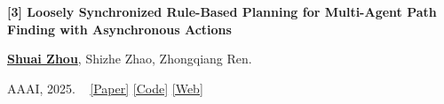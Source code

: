 \documentclass[a4paper,9pt]{extarticle}
\begin{document}
\par\textbf{[3] Loosely Synchronized Rule-Based Planning for
Multi-Agent Path Finding with Asynchronous Actions}
\par\textup{\underline{\textbf{Shuai Zhou}}, Shizhe Zhao, Zhongqiang Ren.}  %
\par\textup{AAAI, 2025. \  \textbar{} \href{https://doi.org/10.1609/aaai.v39i14.33618}{[Paper]}  \textbar{} \href{https://github.com/rap-lab-org/public_LSRP}{[Code]}  \href{https://rap-lab.github.io/research/mapfaa}{[Web]}}
\end{document}
